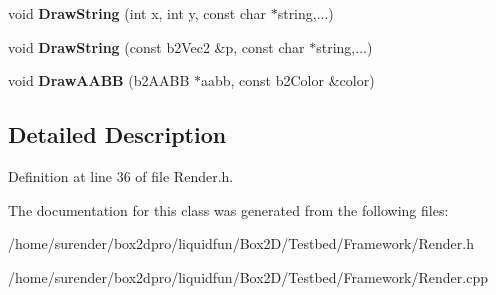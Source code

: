 \begin{DoxyCompactItemize}
\item 
\hypertarget{classDebugDraw_a395164a66033cc6e3b7fb596a67f2ea4}{void {\bfseries Draw\-String} (int x, int y, const char $\ast$string,...)}\label{classDebugDraw_a395164a66033cc6e3b7fb596a67f2ea4}

\item 
\hypertarget{classDebugDraw_a906613c14254b663e714d57af5e659ee}{void {\bfseries Draw\-String} (const b2\-Vec2 \&p, const char $\ast$string,...)}\label{classDebugDraw_a906613c14254b663e714d57af5e659ee}

\item 
\hypertarget{classDebugDraw_a9a2a74e510bac791747b2b7badf750b9}{void {\bfseries Draw\-A\-A\-B\-B} (b2\-A\-A\-B\-B $\ast$aabb, const b2\-Color \&color)}\label{classDebugDraw_a9a2a74e510bac791747b2b7badf750b9}

\end{DoxyCompactItemize}


\subsection{Detailed Description}


Definition at line 36 of file Render.\-h.



The documentation for this class was generated from the following files\-:\begin{DoxyCompactItemize}
\item 
/home/surender/box2dpro/liquidfun/\-Box2\-D/\-Testbed/\-Framework/Render.\-h\item 
/home/surender/box2dpro/liquidfun/\-Box2\-D/\-Testbed/\-Framework/Render.\-cpp\end{DoxyCompactItemize}
